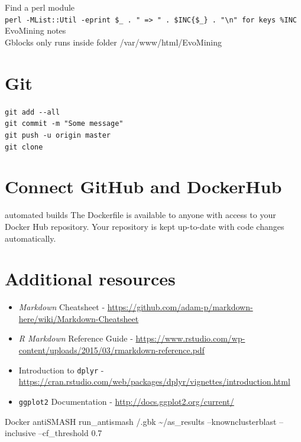 \documentclass[12pt,twoside]{reedthesis}
\begin{document}
{  Find a perl module\\
  \texttt{perl\ -MList::Util\ -e\textquotesingle{}print\ \$\_\ .\ "\ =\textgreater{}\ "\ .\ \$INC\{\$\_\}\ .\ "\textbackslash{}n"\ for\ keys\ \%INC\textquotesingle{}}
  EvoMining notes\\
  Gblocks only runs inside folder /var/www/html/EvoMining
  
  \section{Git}\label{git}
  
  \texttt{git\ add\ -\/-all}\\
  \texttt{git\ commit\ -m\ "Some\ message"}\\
  \texttt{git\ push\ -u\ origin\ master}\\
  \texttt{git\ clone}
  
  \section{Connect GitHub and
  DockerHub}\label{connect-github-and-dockerhub}
  
  automated builds The Dockerfile is available to anyone with access to
  your Docker Hub repository. Your repository is kept up-to-date with code
  changes automatically.
  
  \section{Additional resources}\label{additional-resources}
  
  \begin{itemize}
  \item
    \emph{Markdown} Cheatsheet -
    \url{https://github.com/adam-p/markdown-here/wiki/Markdown-Cheatsheet}
  \item
    \emph{R Markdown} Reference Guide -
    \url{https://www.rstudio.com/wp-content/uploads/2015/03/rmarkdown-reference.pdf}
  \item
    Introduction to \texttt{dplyr} -
    \url{https://cran.rstudio.com/web/packages/dplyr/vignettes/introduction.html}
  \item
    \texttt{ggplot2} Documentation -
    \url{http://docs.ggplot2.org/current/}
  \end{itemize}
  
  Docker antiSMASH run\_antismash /.gbk \textasciitilde{}/as\_results
  --knownclusterblast --inclusive --cf\_threshold 0.7
  
}
\end{document}
